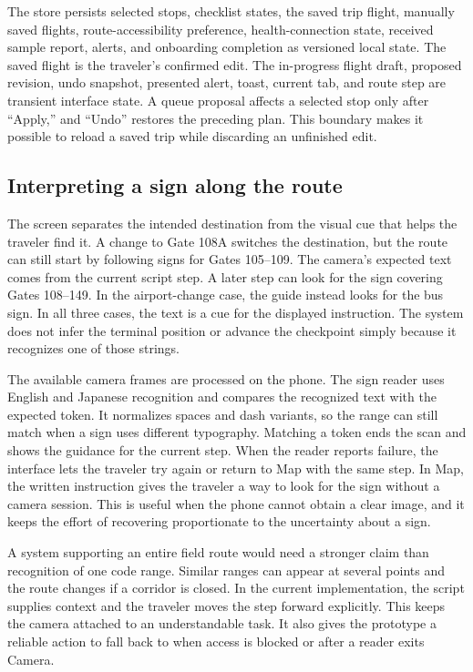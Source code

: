 \documentclass[sigconf,nonacm,balance=false]{acmart}
\begin{document}
The store persists selected stops, checklist states, the saved trip flight, manually saved flights, route-accessibility preference, health-connection state, received sample report, alerts, and onboarding completion as versioned local state. The saved flight is the traveler's confirmed edit. The in-progress flight draft, proposed revision, undo snapshot, presented alert, toast, current tab, and route step are transient interface state. A queue proposal affects a selected stop only after ``Apply,'' and ``Undo'' restores the preceding plan. This boundary makes it possible to reload a saved trip while discarding an unfinished edit.

\subsection{Interpreting a sign along the route}
The screen separates the intended destination from the visual cue that helps the traveler find it. A change to Gate 108A switches the destination, but the route can still start by following signs for Gates 105--109. The camera's expected text comes from the current script step. A later step can look for the sign covering Gates 108--149. In the airport-change case, the guide instead looks for the bus sign. In all three cases, the text is a cue for the displayed instruction. The system does not infer the terminal position or advance the checkpoint simply because it recognizes one of those strings.

The available camera frames are processed on the phone. The sign reader uses English and Japanese recognition and compares the recognized text with the expected token. It normalizes spaces and dash variants, so the range can still match when a sign uses different typography. Matching a token ends the scan and shows the guidance for the current step. When the reader reports failure, the interface lets the traveler try again or return to Map with the same step. In Map, the written instruction gives the traveler a way to look for the sign without a camera session. This is useful when the phone cannot obtain a clear image, and it keeps the effort of recovering proportionate to the uncertainty about a sign.

A system supporting an entire field route would need a stronger claim than recognition of one code range. Similar ranges can appear at several points and the route changes if a corridor is closed. In the current implementation, the script supplies context and the traveler moves the step forward explicitly. This keeps the camera attached to an understandable task. It also gives the prototype a reliable action to fall back to when access is blocked or after a reader exits Camera.
\end{document}
